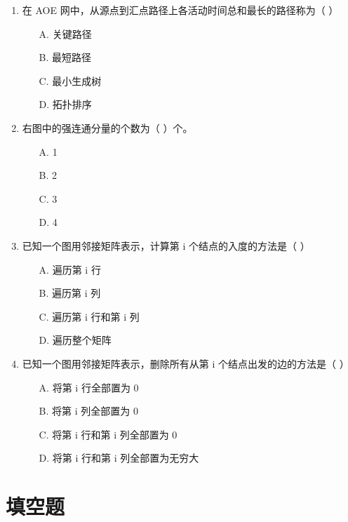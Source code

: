 \documentclass[12pt, a4paper]{article}
\begin{document}
\begin{enumerate}[label=\arabic*.]
	\item 在 AOE 网中，从源点到汇点路径上各活动时间总和最长的路径称为（ ）
	      \begin{enumerate}
		      \item[A.] 关键路径
		      \item[B.] 最短路径
		      \item[C.] 最小生成树
		      \item[D.] 拓扑排序
	      \end{enumerate}

	\item 右图中的强连通分量的个数为（ ）个。
	      \begin{enumerate}
		      \item[A.] 1
		      \item[B.] 2
		      \item[C.] 3
		      \item[D.] 4
	      \end{enumerate}

	\item 已知一个图用邻接矩阵表示，计算第 i 个结点的入度的方法是（ ）
	      \begin{enumerate}
		      \item[A.] 遍历第 i 行
		      \item[B.] 遍历第 i 列
		      \item[C.] 遍历第 i 行和第 i 列
		      \item[D.] 遍历整个矩阵
	      \end{enumerate}

	\item 已知一个图用邻接矩阵表示，删除所有从第 i 个结点出发的边的方法是（ ）
	      \begin{enumerate}
		      \item[A.] 将第 i 行全部置为 0
		      \item[B.] 将第 i 列全部置为 0
		      \item[C.] 将第 i 行和第 i 列全部置为 0
		      \item[D.] 将第 i 行和第 i 列全部置为无穷大
	      \end{enumerate}
\end{enumerate}

\section*{填空题}
\end{document}
